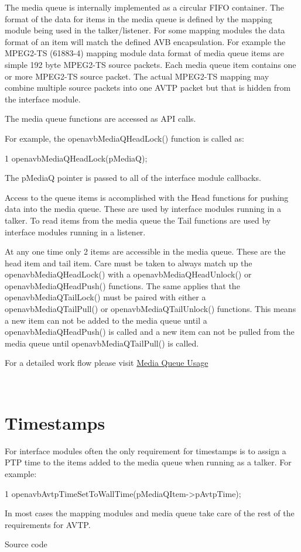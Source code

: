 The media queue is internally implemented as a circular F\+I\+FO container. The format of the data for items in the media queue is defined by the mapping module being used in the talker/listener. For some mapping modules the data format of an item will match the defined A\+VB encapsulation. For example the M\+P\+E\+G2-\/\+TS (61883-\/4) mapping module data format of media queue items are simple 192 byte M\+P\+E\+G2-\/\+TS source packets. Each media queue item contains one or more M\+P\+E\+G2-\/\+TS source packet. The actual M\+P\+E\+G2-\/\+TS mapping may combine multiple source packets into one A\+V\+TP packet but that is hidden from the interface module.

The media queue functions are accessed as A\+PI calls.

For example, the openavb\+Media\+Q\+Head\+Lock() function is called as\+: 
\begin{DoxyCode}
1 openavbMediaQHeadLock(pMediaQ);
\end{DoxyCode}
 The p\+MediaQ pointer is passed to all of the interface module callbacks.

Access to the queue items is accomplished with the Head functions for pushing data into the media queue. These are used by interface modules running in a talker. To read items from the media queue the Tail functions are used by interface modules running in a listener.

At any one time only 2 items are accessible in the media queue. These are the head item and tail item. Care must be taken to always match up the openavb\+Media\+Q\+Head\+Lock() with a openavb\+Media\+Q\+Head\+Unlock() or openavb\+Media\+Q\+Head\+Push() functions. The same applies that the openavb\+Media\+Q\+Tail\+Lock() must be paired with either a openavb\+Media\+Q\+Tail\+Pull() or openavb\+Media\+Q\+Tail\+Unlock() functions. This means a new item can not be added to the media queue until a openavb\+Media\+Q\+Head\+Push() is called and a new item can not be pulled from the media queue until openavb\+Media\+Q\+Tail\+Pull() is called.

For a detailed work flow please visit \hyperlink{sdk_notes_media_queue_usage}{Media Queue Usage}

~\newline
\hypertarget{sdk_avtp_interface_module_dev_sdk_avtp_intf_module_timestamps}{}\section{Timestamps }\label{sdk_avtp_interface_module_dev_sdk_avtp_intf_module_timestamps}
For interface modules often the only requirement for timestamps is to assign a P\+TP time to the items added to the media queue when running as a talker. For example\+: 
\begin{DoxyCode}
1 openavbAvtpTimeSetToWallTime(pMediaQItem->pAvtpTime);
\end{DoxyCode}
 In most cases the mapping modules and media queue take care of the rest of the requirements for A\+V\+TP.

Source code 